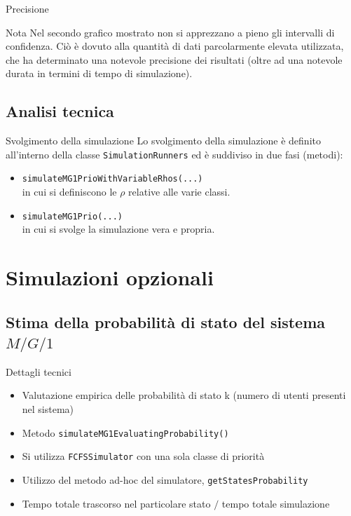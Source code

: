 \documentclass[slidestop,compress,mathserif]{beamer}
\begin{document}
\begin{frame}{Precisione}
\begin{block}{Nota}
Nel secondo grafico mostrato non si apprezzano a pieno gli intervalli di confidenza. Ci\`o \`e dovuto alla quantit\`a di dati parcolarmente elevata utilizzata, che  ha determinato una notevole precisione dei risultati (oltre ad una notevole durata in termini di tempo di simulazione).
\end{block}
\end{frame}

\subsection{Analisi tecnica}
\begin{frame}{Svolgimento della simulazione}
Lo svolgimento della simulazione \`e definito all'interno della classe {\tt SimulationRunners} ed \`e suddiviso in due fasi (metodi):
\begin{itemize}
\item {\tt simulateMG1PrioWithVariableRhos(...)}\\
in cui si definiscono le $\rho$ relative alle varie classi.
\item {\tt simulateMG1Prio(...)}\\
in cui si svolge la simulazione vera e propria.
\end{itemize}
\end{frame}

\section{Simulazioni opzionali}
\subsection{Stima della probabilit\`a di stato del sistema $M/G/1$}
\begin{frame}{Dettagli tecnici}
\vfill
\begin{itemize}
	\item Valutazione empirica delle probabilit\`a di stato k (numero di utenti presenti nel sistema)
	\item Metodo {\tt simulateMG1EvaluatingProbability()}
	\item Si utilizza {\tt FCFSSimulator} con una sola classe di priorit\`a
	\item Utilizzo del metodo ad-hoc del simulatore, {\tt getStatesProbability}
	\item Tempo totale trascorso nel particolare stato $/$ tempo totale simulazione
\end{itemize}
\vfill
\end{frame}
\end{document}
